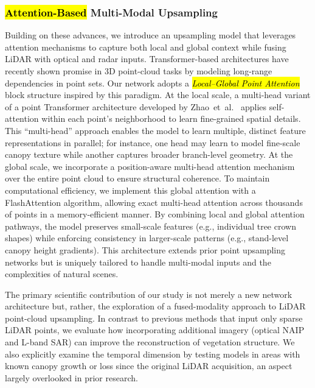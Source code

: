 \documentclass[remotesensing,article,accept,pdftex,moreauthors]{Definitions/mdpi}
\begin{document}
\subsubsection*{\hl{Attention-Based} %
 Multi-Modal Upsampling}

Building on these advances, we introduce an upsampling model that leverages attention mechanisms to capture both local and global context while fusing LiDAR with optical and radar inputs. Transformer-based architectures have recently shown promise in 3D point-cloud tasks by modeling long-range dependencies in point sets. Our network adopts a \emph{\hl{Local--Global Point Attention}} block structure inspired by this paradigm. At the local scale, a multi-head variant of a point Transformer architecture developed by \mbox{Zhao et al. \cite{zhao2021point}} applies self-attention within each point’s neighborhood to learn fine-grained spatial details. This “multi-head” approach enables the model to learn multiple, distinct feature representations in parallel; for instance, one head may learn to model fine-scale canopy texture while another captures broader branch-level geometry. At the global scale, we incorporate a position-aware multi-head attention mechanism over the entire point cloud to ensure structural coherence. To maintain computational efficiency, we implement this global attention with a FlashAttention \cite{dao2022flashattention} algorithm, allowing exact multi-head attention across thousands of points in a memory-efficient manner. By combining local and global attention pathways, the model preserves small-scale features (e.g., individual tree crown shapes) while enforcing consistency in larger-scale patterns (e.g., stand-level canopy height gradients). This architecture extends prior point upsampling networks but is uniquely tailored to handle multi-modal inputs and the complexities of natural scenes.

The primary scientific contribution of our study is not merely a new network architecture but, rather, the exploration of a fused-modality approach to LiDAR point-cloud upsampling. In contrast to previous methods that input only sparse LiDAR points, we evaluate how incorporating additional imagery (optical NAIP and L-band SAR) can improve the reconstruction of vegetation structure. We also explicitly examine the temporal dimension by testing models in areas with known canopy growth or loss since the original LiDAR acquisition, an aspect largely overlooked in prior research.
\end{document}
